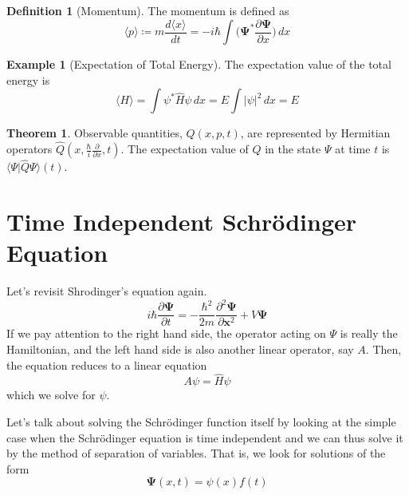 \documentclass{article}
\newcommand{\braket}[2]{\langle #1 | #2 \rangle}
\theoremstyle{definition}
\newtheorem{theorem}{Theorem}[section]
\newtheorem{example}{Example}[section]
\newtheorem{definition}{Definition}[section]
\begin{document}
      \begin{definition}[Momentum]
        The momentum is defined as 
        \begin{equation} 
          \langle p \rangle \coloneqq m \frac{d \langle x \rangle}{dt} = - i\hbar \int \bigg( \boldsymbol{\Psi}^\ast \frac{\partial \boldsymbol{\Psi}}{\partial x} \bigg)  \,dx
        \end{equation}
      \end{definition}

      \begin{example}[Expectation of Total Energy]
        The expectation value of the total energy is 
        \begin{equation} 
          \langle H \rangle = \int \psi^\ast \hat{H} \psi \,dx = E \int |\psi|^2 \,dx = E
        \end{equation}      
      \end{example}

      \begin{theorem} 
        Observable quantities, $Q(x, p, t)$, are represented by Hermitian operators $\hat{Q}(x, \frac{\hbar}{i} \frac{\partial}{\partial x}, t)$. The expectation value of $Q$ in the state $\Psi$ at time $t$ is $\braket{\Psi}{\hat{Q} \Psi} (t)$. 
      \end{theorem}

    

\section{Time Independent Schr\"odinger Equation}

  Let's revisit Shrodinger's equation again. 
  \begin{equation} 
    i \hbar \frac{\partial \boldsymbol{\Psi}}{\partial t} = - \frac{\hbar^2}{2m} \frac{\partial^2 \boldsymbol{\Psi}}{\partial \mathbf{x}^2} + V \boldsymbol{\Psi}
  \end{equation}
  If we pay attention to the right hand side, the operator acting on $\Psi$ is really the Hamiltonian, and the left hand side is also another linear operator, say $A$. Then, the equation reduces to a linear equation 
  \begin{equation} 
    A \psi = \hat{H} \psi
  \end{equation}
  which we solve for $\psi$. 

  

  Let's talk about solving the Schr\"odinger function itself by looking at the simple case when the Schr\"odinger equation is time independent and we can thus solve it by the method of separation of variables. That is, we look for solutions of the form 
  \begin{equation} 
    \boldsymbol{\Psi}(x, t) = \psi(x) f(t)
  \end{equation}
\end{document}
